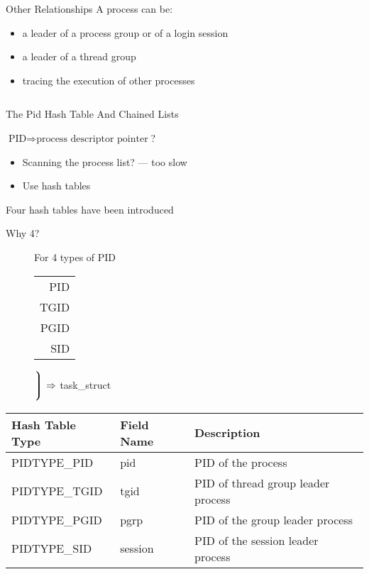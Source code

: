 \begin{frame}
  \begin{center}
  \end{center}
\end{frame}

\begin{frame}[fragile=singleslide]
  \begin{block}{Other Relationships}
    A process can be:
    \begin{itemize}
    \item a leader of a process group or of a login session
    \item a leader of a thread group
    \item tracing the execution of other processes
    \end{itemize}
  \end{block}
  \vspace{1em}
  \inputminted[fontsize=\small]{c}{../figs/relationship.c}
\end{frame}

\begin{frame}{The Pid Hash Table And Chained Lists}
  \begin{block}{$\text{PID} \Rightarrow \text{process descriptor pointer}$?}
    \begin{itemize}
    \item Scanning the process list? --- too slow
    \item Use hash tables
    \end{itemize}
  \end{block}
  \begin{block}{Four hash tables have been introduced}
    \begin{description}
    \item[Why 4?] For 4 types of PID
      {\ttfamily
      \begin{tabular}{r}
        PID\\ TGID\\ PGID\\ SID
      \end{tabular}$\Biggr\rgroup\Rightarrow$ task\_struct}
    \end{description}
  \end{block}
\end{frame}

\begin{center}{\ttfamily
  \begin{tabular}{lll}
    Hash Table Type & Field Name & Description \\
    \hline
    PIDTYPE\_PID & pid & PID of the process \\
    PIDTYPE\_TGID & tgid & PID of thread group leader process \\
    PIDTYPE\_PGID & pgrp & PID of the group leader process \\
    PIDTYPE\_SID & session & PID of the session leader process \\
  \end{tabular}}
\end{center}

